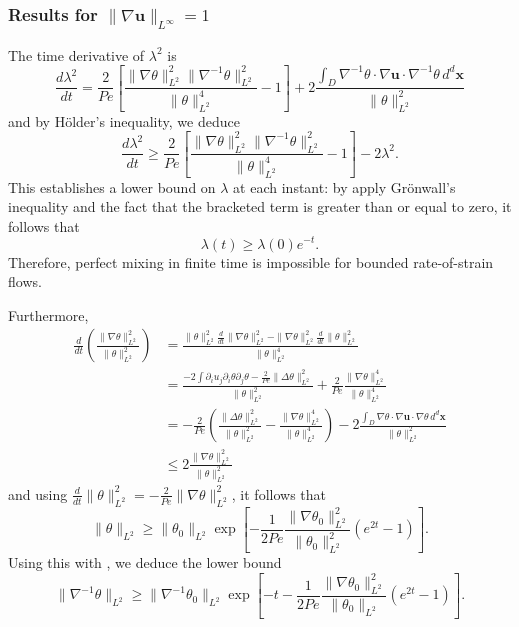 \documentclass[12pt]{iopart}
\newcommand{\ddt}[1]{\frac{d #1}{dt}}
\newcommand{\hmone}[1]{\|\nabla^{-1} #1\|_{L^{2}}}
\newcommand{\ltwo}[1]{\|#1\|_{L^{2}}}
\newcommand{\hone}[1]{\| \nabla #1\|_{L^{2}}}
\newcommand{\sint}[1]{\int_{D} #1 \, d^{d}\mathbf{x}}
\renewcommand{\vec}[1]{\mathbf{#1}}
\newcommand{\linf}[1]{\| #1 \|_{L^{\infty}}}
\begin{document}
\label{sec:linfty_flows}
\subsubsection{Results for $\linf{\nabla \vec{u}} = 1$}

The time derivative of $\lambda^2$ is
%
\begin{equation*}
	\ddt{\lambda^2} = \frac{2}{Pe}
		\left[ 
			\frac{\hone{\theta}^2\hmone{\theta}^2}
					{\ltwo{\theta}^4}  
			- 1
		\right]
		+ 2 \frac{\sint{\nabla^{-1}\theta \cdot \nabla\vec{u} \cdot 
							\nabla^{-1}\theta  }}
					  {\ltwo{\theta}^{2}}
\end{equation*}
and by H\"older's inequality, we deduce
\begin{equation*}
\label{eq:length_ineq_rate-of-strain}
	\ddt{\lambda^2} \geq \frac{2}{Pe} \left[ 
			\frac{\hone{\theta}^2\hmone{\theta}^2}
					{\ltwo{\theta}^4}  
			- 1
		\right] - 2  \lambda^2 .
\end{equation*}
This establishes a lower bound on $\lambda$ at each instant: by apply Gr\"onwall's inequality and the fact that the bracketed term is greater than or equal to zero, it follows that
%
\begin{equation}
\label{eq:exponential_enstrophy}
	\lambda (t) \geq \lambda(0)e^{- t}.
\end{equation}
%
Therefore, perfect mixing in finite time is impossible for bounded rate-of-strain flows.

Furthermore,
%
 \begin{eqnarray*}
\frac{d}{dt}\left(\frac{\|\nabla\theta\|_{L^{2}}^2}{\|\theta\|_{L^{2}}^2}\right) &= \frac{\|\theta\|_{L^{2}}^2\frac{d}{dt}\|\nabla\theta\|_{L^{2}}^2-\|\nabla\theta\|_{L^{2}}^2\frac{d}{dt}\|\theta\|_{L^{2}}^2}{\|\theta\|_{L^{2}}^4}\\
&= \frac{-2\int \partial_{i}u_{j}\partial_{i}\theta\partial_{j}\theta - \frac{2}{Pe} \|\Delta\theta\|_{L^{2}}^2}{\|\theta\|_{L^{2}}^2}+\frac{2}{Pe}\frac{\|\nabla\theta\|_{L^{2}}^4}{\|\theta\|_{L^{2}}^4} \\
&=-\frac{2}{Pe}\left(\frac{\|\Delta\theta\|_{L^{2}}^2}{\|\theta\|_{L^{2}}^2} - \frac{\|\nabla\theta\|_{L^{2}}^4}{\|\theta\|_{L^{2}}^4} \right) - 2\frac{\sint{\nabla\theta \cdot \nabla\vec{u} \cdot \nabla\theta  }}{\|\theta\|_{L^{2}}^2} 
\\
&\leq 2 \frac{\hone{\theta}^2}{\ltwo{\theta}^2}
\end{eqnarray*}
and using $\ddt{}\ltwo{\theta}^2 = -\frac{2}{Pe} \hone{\theta}^2$, it follows that
\begin{equation}
\ltwo{\theta}\geq  \ltwo{\theta_{0}}\exp\left[-\frac{1}{2Pe}\frac{\hone{\theta_{0}}^2}{\ltwo{\theta_{0}}^2}\left(e^{2 t} -1\right)\right].
\end{equation}
Using this with , we deduce the lower bound
\begin{equation}
\hmone{\theta} \geq  \hmone{\theta_{0}} \exp\left[- t -\frac{1}{2 Pe}\frac{\hone{\theta_{0}}^2}{\ltwo{\theta_{0}}}\left(e^{2 t} -1\right)\right].
\end{equation}
\end{document}
